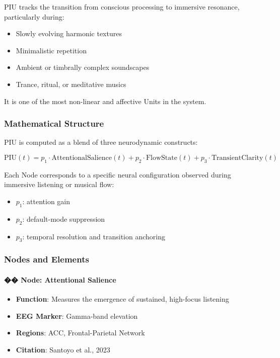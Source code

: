PIU tracks the transition from conscious processing to immersive resonance, particularly during:

\begin{itemize}
    \item Slowly evolving harmonic textures
    \item Minimalistic repetition
    \item Ambient or timbrally complex soundscapes
    \item Trance, ritual, or meditative musics
\end{itemize}

It is one of the most non-linear and affective Units in the system.

\subsubsection*{Mathematical Structure}

PIU is computed as a blend of three neurodynamic constructs:

\[
\text{PIU}(t) = p_1 \cdot \text{AttentionalSalience}(t) + p_2 \cdot \text{FlowState}(t) + p_3 \cdot \text{TransientClarity}(t)
\]

Each Node corresponds to a specific neural configuration observed during immersive listening or musical flow:

\begin{itemize}
    \item $p_1$: attention gain
    \item $p_2$: default-mode suppression
    \item $p_3$: temporal resolution and transition anchoring
\end{itemize}

\subsubsection*{Nodes and Elements}

\paragraph{�� Node: Attentional Salience}

\begin{itemize}
    \item \textbf{Function}: Measures the emergence of sustained, high-focus listening
    \item \textbf{EEG Marker}: Gamma-band elevation
    \item \textbf{Regions}: ACC, Frontal-Parietal Network
    \item \textbf{Citation}: Santoyo et al., 2023
\end{itemize}

